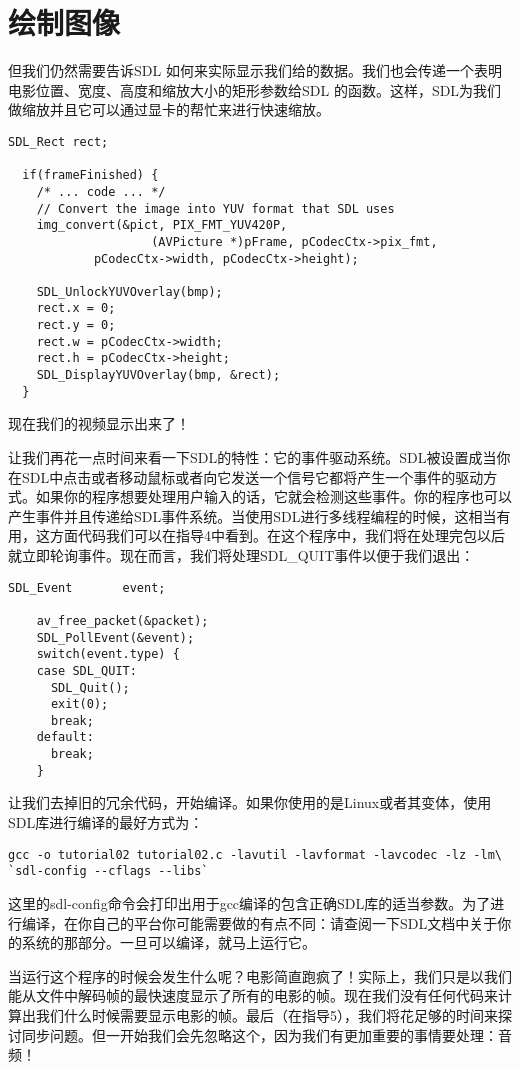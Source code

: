 \section{绘制图像}

但我们仍然需要告诉SDL 如何来实际显示我们给的数据。我们也会传递一个表明电影位置、宽度、高度和缩放大小的矩形参数给SDL 的函数。这样，SDL为我们做缩放并且它可以通过显卡的帮忙来进行快速缩放。

\begin{lstlisting}
SDL_Rect rect;

  if(frameFinished) {
    /* ... code ... */
    // Convert the image into YUV format that SDL uses
    img_convert(&pict, PIX_FMT_YUV420P,
                    (AVPicture *)pFrame, pCodecCtx->pix_fmt,
            pCodecCtx->width, pCodecCtx->height);

    SDL_UnlockYUVOverlay(bmp);
    rect.x = 0;
    rect.y = 0;
    rect.w = pCodecCtx->width;
    rect.h = pCodecCtx->height;
    SDL_DisplayYUVOverlay(bmp, &rect);
  }
\end{lstlisting}

现在我们的视频显示出来了！

让我们再花一点时间来看一下SDL的特性：它的事件驱动系统。SDL被设置成当你在SDL中点击或者移动鼠标或者向它发送一个信号它都将产生一个事件的驱动方式。如果你的程序想要处理用户输入的话，它就会检测这些事件。你的程序也可以产生事件并且传递给SDL事件系统。当使用SDL进行多线程编程的时候，这相当有用，这方面代码我们可以在指导4中看到。在这个程序中，我们将在处理完包以后就立即轮询事件。现在而言，我们将处理SDL_QUIT事件以便于我们退出：

\begin{lstlisting}
SDL_Event       event;

    av_free_packet(&packet);
    SDL_PollEvent(&event);
    switch(event.type) {
    case SDL_QUIT:
      SDL_Quit();
      exit(0);
      break;
    default:
      break;
    }
\end{lstlisting}

让我们去掉旧的冗余代码，开始编译。如果你使用的是Linux或者其变体，使用SDL库进行编译的最好方式为：
\begin{lstlisting}
gcc -o tutorial02 tutorial02.c -lavutil -lavformat -lavcodec -lz -lm\
`sdl-config --cflags --libs`
\end{lstlisting}


这里的sdl-config命令会打印出用于gcc编译的包含正确SDL库的适当参数。为了进行编译，在你自己的平台你可能需要做的有点不同：请查阅一下SDL文档中关于你的系统的那部分。一旦可以编译，就马上运行它。

当运行这个程序的时候会发生什么呢？电影简直跑疯了！实际上，我们只是以我们能从文件中解码帧的最快速度显示了所有的电影的帧。现在我们没有任何代码来计算出我们什么时候需要显示电影的帧。最后（在指导5），我们将花足够的时间来探讨同步问题。但一开始我们会先忽略这个，因为我们有更加重要的事情要处理：音频！
